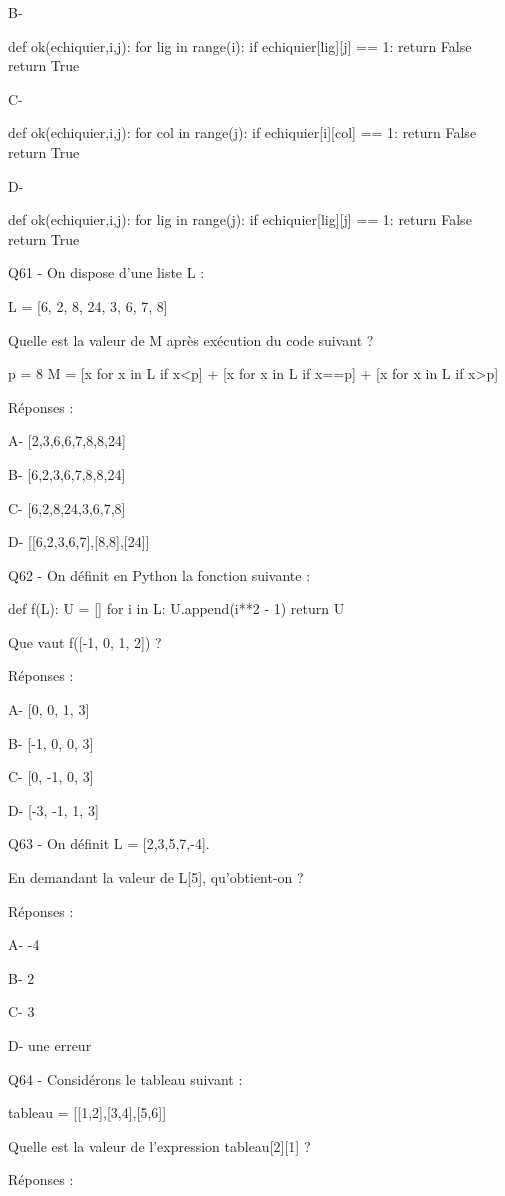 \documentclass[
]{book}
\begin{document}
B-

def ok(echiquier,i,j):
for lig in range(i):
if echiquier{[}lig{]}{[}j{]} == 1:
return False
return True

C-

def ok(echiquier,i,j):
for col in range(j):
if echiquier{[}i{]}{[}col{]} == 1:
return False
return True

D-

def ok(echiquier,i,j):
for lig in range(j):
if echiquier{[}lig{]}{[}j{]} == 1:
return False
return True

Q61 - On dispose d'une liste L :

L = {[}6, 2, 8, 24, 3, 6, 7, 8{]}

Quelle est la valeur de M après exécution du code suivant ?

p = 8
M = {[}x for x in L if x\textless p{]} + {[}x for x in L if x==p{]} + {[}x for x in L if x\textgreater p{]}

Réponses :

A- {[}2,3,6,6,7,8,8,24{]}

B- {[}6,2,3,6,7,8,8,24{]}

C- {[}6,2,8,24,3,6,7,8{]}

D- {[}{[}6,2,3,6,7{]},{[}8,8{]},{[}24{]}{]}

Q62 - On définit en Python la fonction suivante :

def f(L):
U = {[}{]}
for i in L:
U.append(i**2 - 1)
return U

Que vaut f({[}-1, 0, 1, 2{]}) ?

Réponses :

A- {[}0, 0, 1, 3{]}

B- {[}-1, 0, 0, 3{]}

C- {[}0, -1, 0, 3{]}

D- {[}-3, -1, 1, 3{]}

Q63 - On définit L = {[}2,3,5,7,-4{]}.

En demandant la valeur de L{[}5{]}, qu'obtient-on ?

Réponses :

A- -4

B- 2

C- 3

D- une erreur

Q64 - Considérons le tableau suivant :

tableau = {[}{[}1,2{]},{[}3,4{]},{[}5,6{]}{]}

Quelle est la valeur de l'expression tableau{[}2{]}{[}1{]} ?

Réponses :
\end{document}
